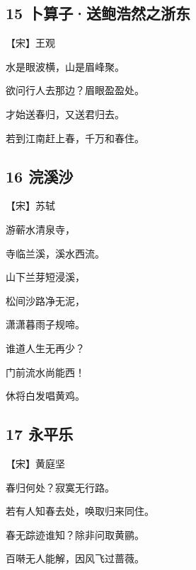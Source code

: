 \documentclass[12pt]{article}
\begin{document}
\subsection*{15 卜算子·送鲍浩然之浙东}

【宋】王观

水是眼波横，山是眉峰聚。

欲问行人去那边？眉眼盈盈处。

才始送春归，又送君归去。

若到江南赶上春，千万和春住。

\subsection*{16 浣溪沙}

【宋】苏轼

游蕲水清泉寺，

寺临兰溪，溪水西流。

山下兰芽短浸溪，

松间沙路净无泥，

潇潇暮雨子规啼。

谁道人生无再少？

门前流水尚能西！

休将白发唱黄鸡。

\subsection*{17 永平乐}

【宋】黄庭坚

春归何处？寂寞无行路。

若有人知春去处，唤取归来同住。

春无踪迹谁知？除非问取黄鹂。

百啭无人能解，因风飞过蔷薇。
\end{document}
